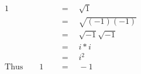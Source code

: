 \begin{align*}
1\quad&\,=\quad\sqrt{1}\\
\,&\,=\quad\sqrt{(-1)(-1)}\\
\,&\,=\quad\sqrt{-1}\sqrt{-1}\\
\,&\,=\quad i*i\\
\,&\,=\quad i^2\\
\mathrm{Thus}\qquad1\quad&\,=\quad-1
\end{align*}
